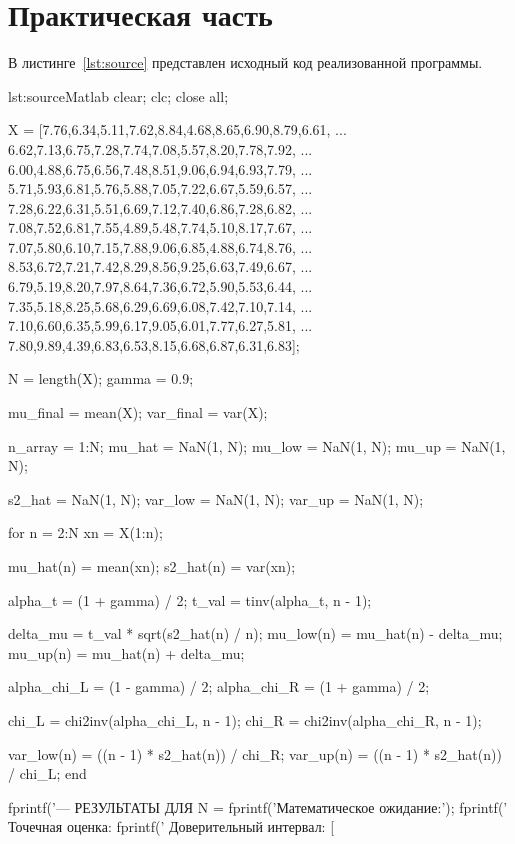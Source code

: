 \section{Практическая часть}
В листинге~\ref{lst:source} представлен исходный код реализованной программы.
\begin{listing}{lst:source}{Matlab}
clear; clc; close all;

X = [7.76,6.34,5.11,7.62,8.84,4.68,8.65,6.90,8.79,6.61, ...
    6.62,7.13,6.75,7.28,7.74,7.08,5.57,8.20,7.78,7.92, ...
    6.00,4.88,6.75,6.56,7.48,8.51,9.06,6.94,6.93,7.79, ...
    5.71,5.93,6.81,5.76,5.88,7.05,7.22,6.67,5.59,6.57, ...
    7.28,6.22,6.31,5.51,6.69,7.12,7.40,6.86,7.28,6.82, ...
    7.08,7.52,6.81,7.55,4.89,5.48,7.74,5.10,8.17,7.67, ...
    7.07,5.80,6.10,7.15,7.88,9.06,6.85,4.88,6.74,8.76, ...
    8.53,6.72,7.21,7.42,8.29,8.56,9.25,6.63,7.49,6.67, ...
    6.79,5.19,8.20,7.97,8.64,7.36,6.72,5.90,5.53,6.44, ...
    7.35,5.18,8.25,5.68,6.29,6.69,6.08,7.42,7.10,7.14, ...
    7.10,6.60,6.35,5.99,6.17,9.05,6.01,7.77,6.27,5.81, ...
    7.80,9.89,4.39,6.83,6.53,8.15,6.68,6.87,6.31,6.83];

N = length(X);
gamma = 0.9;

mu_final  = mean(X);
var_final = var(X);

n_array = 1:N;
mu_hat  = NaN(1, N);
mu_low  = NaN(1, N);
mu_up   = NaN(1, N);

s2_hat  = NaN(1, N);
var_low = NaN(1, N);
var_up  = NaN(1, N);

for n = 2:N
    xn = X(1:n);
    
    mu_hat(n) = mean(xn);
    s2_hat(n) = var(xn);
    
    alpha_t = (1 + gamma) / 2;
    t_val   = tinv(alpha_t, n - 1);
    
    delta_mu = t_val * sqrt(s2_hat(n) / n);
    mu_low(n) = mu_hat(n) - delta_mu;
    mu_up(n)  = mu_hat(n) + delta_mu;
    
    alpha_chi_L = (1 - gamma) / 2;
    alpha_chi_R = (1 + gamma) / 2;
    
    chi_L = chi2inv(alpha_chi_L, n - 1);
    chi_R = chi2inv(alpha_chi_R, n - 1);
    
    var_low(n) = ((n - 1) * s2_hat(n)) / chi_R;
    var_up(n)  = ((n - 1) * s2_hat(n)) / chi_L;
end

fprintf('--- РЕЗУЛЬТАТЫ ДЛЯ N = %
fprintf('Математическое ожидание:\n');
fprintf('  Точечная оценка: %
fprintf('  Доверительный интервал: [%


\end{listing}
